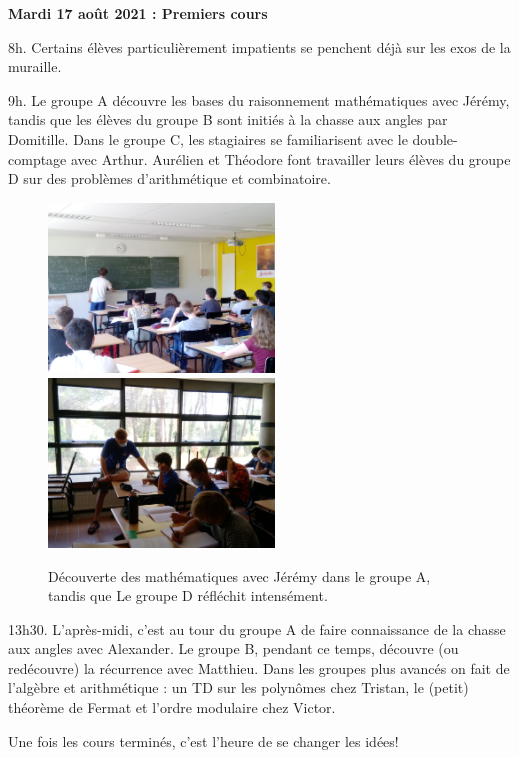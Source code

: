 \begin{center}
{\textbf{Mardi 17 août 2021 : Premiers cours}}
\end{center}
\vspace{2mm}

8h. Certains élèves particulièrement impatients se penchent déjà sur les exos de la muraille.

9h. Le groupe A découvre les bases du raisonnement mathématiques avec Jérémy, tandis que les élèves du groupe B sont initiés à la chasse aux angles par Domitille. Dans le groupe C, les stagiaires se familiarisent avec le double-comptage avec Arthur. Aurélien et Théodore font travailler leurs élèves du groupe D sur des problèmes d’arithmétique et combinatoire.

\begin{figure}[H]
\centering\includegraphics[width=6cm]{CR-17-0.jpg}\hspace{2cm}\includegraphics[width=6cm]{CR-17-1.jpg}
\caption{Découverte des mathématiques avec Jérémy dans le groupe A, tandis que Le groupe D réfléchit intensément.}
\end{figure}

13h30. L’après-midi, c’est au tour du groupe A de faire connaissance de la chasse aux angles avec Alexander. Le groupe B, pendant ce temps, découvre (ou redécouvre) la récurrence avec Matthieu. Dans les groupes plus avancés on fait de l’algèbre et arithmétique : un TD sur les polynômes chez Tristan, le (petit) théorème de Fermat et l’ordre modulaire chez Victor.

Une fois les cours terminés, c’est l’heure de se changer les idées!

